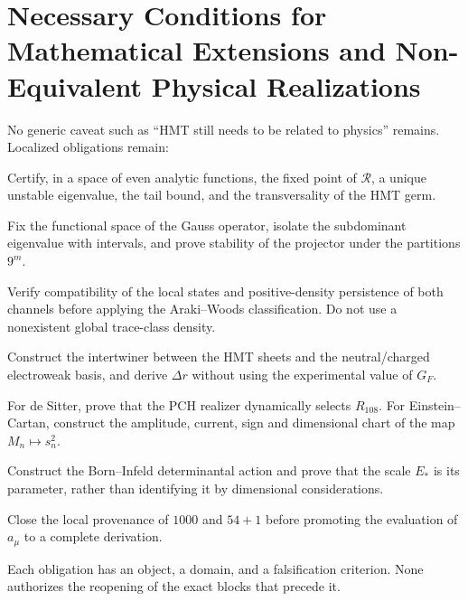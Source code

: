 \section{Necessary Conditions for Mathematical Extensions and Non-Equivalent Physical Realizations}

No generic caveat such as ``HMT still needs to be related to
physics'' remains. Localized obligations remain:

\begin{description}[style=nextline,leftmargin=37mm]
\item[CHAOS-OBL-1]
Certify, in a space of even analytic functions, the fixed point of
\(\mathcal R\), a unique unstable eigenvalue, the tail bound, and the
transversality of the HMT germ.

\item[GAUSS-OBL-1]
Fix the functional space of the Gauss operator, isolate the subdominant
eigenvalue with intervals, and prove stability of the projector under the
partitions \(9^m\).

\item[HMOD-OBL-1]
Verify compatibility of the local states and positive-density persistence of
both channels before applying the Araki--Woods classification.
Do not use a nonexistent global trace-class density.

\item[EW-OBL-1]
Construct the intertwiner between the HMT sheets and the neutral/charged electroweak basis,
and derive \(\Delta r\) without using the experimental value of \(G_F\).

\item[COS-OBL-1]
For de Sitter, prove that the PCH realizer dynamically selects
\(R_{108}\). For Einstein--Cartan, construct the amplitude, current, sign and
dimensional chart of the map \(M_n\mapsto s_n^2\).

\item[BORN-OBL-1]
Construct the Born--Infeld determinantal action and prove that the scale
\(E_*\) is its parameter, rather than identifying it by dimensional considerations.

\item[ANOM-OBL-1]
Close the local provenance of \(1000\) and \(54+1\) before promoting the
evaluation of \(a_\mu\) to a complete derivation.
\end{description}

Each obligation has an object, a domain, and a falsification criterion. None authorizes the
reopening of the exact blocks that precede it.

